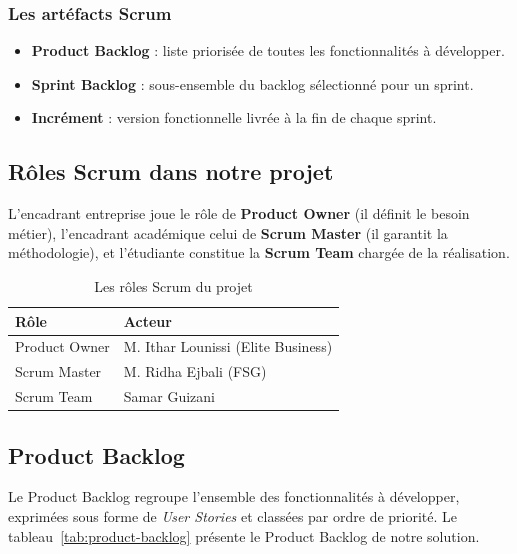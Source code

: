 \documentclass[12pt, oneside, a4paper]{report}
\begin{document}
\subsubsection{Les artéfacts Scrum}
\begin{itemize}
    \item \textbf{Product Backlog} : liste priorisée de toutes les fonctionnalités à développer.
    \item \textbf{Sprint Backlog} : sous-ensemble du backlog sélectionné pour un sprint.
    \item \textbf{Incrément} : version fonctionnelle livrée à la fin de chaque sprint.
\end{itemize}

\subsection{Rôles Scrum dans notre projet}
L'encadrant entreprise joue le rôle de \textbf{Product Owner} (il définit le besoin métier), l'encadrant académique celui de \textbf{Scrum Master} (il garantit la méthodologie), et l'étudiante constitue la \textbf{Scrum Team} chargée de la réalisation.

\begin{table}[H]
\centering
\caption{Les rôles Scrum du projet}
\label{tab:roles-scrum}
\vspace{0.3cm}
\renewcommand{\arraystretch}{1.3}
\begin{tabular}{|l|l|}
\hline
\textbf{Rôle} & \textbf{Acteur} \\
\hline
Product Owner & M. Ithar Lounissi (Elite Business) \\
\hline
Scrum Master & M. Ridha Ejbali (FSG) \\
\hline
Scrum Team & Samar Guizani \\
\hline
\end{tabular}
\end{table}

\subsection{Product Backlog}
Le Product Backlog regroupe l'ensemble des fonctionnalités à développer, exprimées sous forme de \textit{User Stories} et classées par ordre de priorité. Le tableau~\ref{tab:product-backlog} présente le Product Backlog de notre solution.
\end{document}
